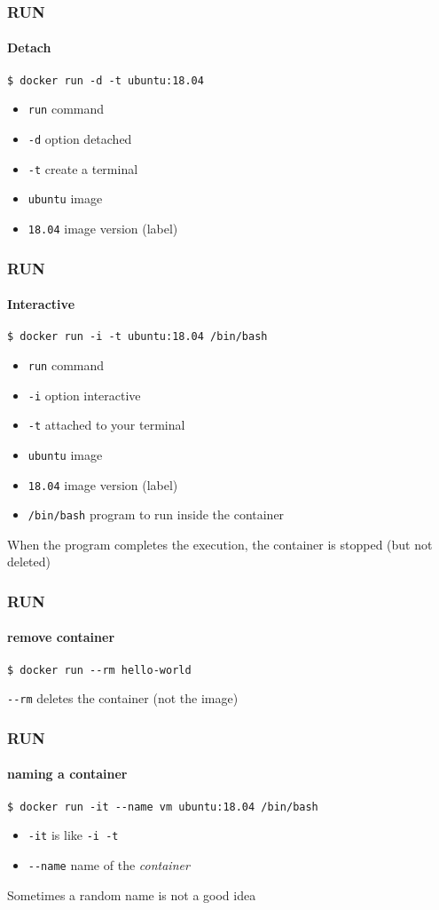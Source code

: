 \begin{frame}[fragile]
\frametitle{RUN}
\framesubtitle{Detach}
\begin{lstlisting}
$ docker run -d -t ubuntu:18.04
\end{lstlisting}

\begin{itemize}
\item \lstinline!run! command
\item \lstinline!-d! option detached
\item \lstinline!-t! create a terminal
\item \lstinline!ubuntu! image
\item \lstinline!18.04! image version (label)
\end{itemize}
\end{frame}

\begin{frame}[fragile]
\frametitle{RUN}
\framesubtitle{Interactive}
\begin{lstlisting}
$ docker run -i -t ubuntu:18.04 /bin/bash
\end{lstlisting}

\begin{itemize}
\item \lstinline!run! command
\item \lstinline!-i! option interactive
\item \lstinline!-t! attached to your terminal
\item \lstinline!ubuntu! image
\item \lstinline!18.04! image version (label)
\item \lstinline!/bin/bash! program to run inside the container
\end{itemize}
When the program completes the execution, the container is stopped (but not deleted)
\end{frame}

\begin{frame}[fragile]
\frametitle{RUN}
\framesubtitle{remove container}
\begin{lstlisting}
$ docker run --rm hello-world
\end{lstlisting}
\lstinline!--rm! deletes the container (not the image)
\end{frame} 
 
\begin{frame}[fragile]
\frametitle{RUN}
\framesubtitle{naming a container}
\begin{lstlisting}
$ docker run -it --name vm ubuntu:18.04 /bin/bash
\end{lstlisting}

\begin{itemize}
\item \lstinline!-it! is like \lstinline!-i -t!
\item \lstinline!--name! name of the \textit{container}
\end{itemize}
Sometimes a random name is not a good idea
\end{frame}

